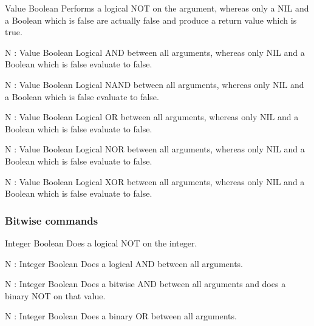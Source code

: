     \begin{commands}

                {Value}
                {Boolean}
                {
                    Performs a logical NOT on the argument, whereas only a NIL
                    and a Boolean which is false are actually false and produce
                    a return value which is true.
                }

                {N : Value}
                {Boolean}
                {
                    Logical AND between all arguments, whereas only NIL and a
                    Boolean which is false evaluate to false.
                }

                {N : Value}
                {Boolean}
                {
                    Logical NAND between all arguments, whereas only NIL and a
                    Boolean which is false evaluate to false.
                }

                {N : Value}
                {Boolean}
                {
                    Logical OR between all arguments, whereas only NIL and a
                    Boolean which is false evaluate to false.
                }

                {N : Value}
                {Boolean}
                {
                    Logical NOR between all arguments, whereas only NIL and a
                    Boolean which is false evaluate to false.
                }

                {N : Value}
                {Boolean}
                {
                    Logical XOR between all arguments, whereas only NIL and a
                    Boolean which is false evaluate to false.
                }

    \end{commands}

\subsubsection{Bitwise commands}

    \begin{commands}

                {Integer}
                {Boolean}
                {
                    Does a logical NOT on the integer.
                }

                {N : Integer}
                {Boolean}
                {
                    Does a logical AND between all arguments.
                }

                {N : Integer}
                {Boolean}
                {
                    Does a bitwise AND between all arguments and does a binary
                    NOT on that value.
                }

                {N : Integer}
                {Boolean}
                {
                    Does a binary OR between all arguments.
                }

    \end{commands}



